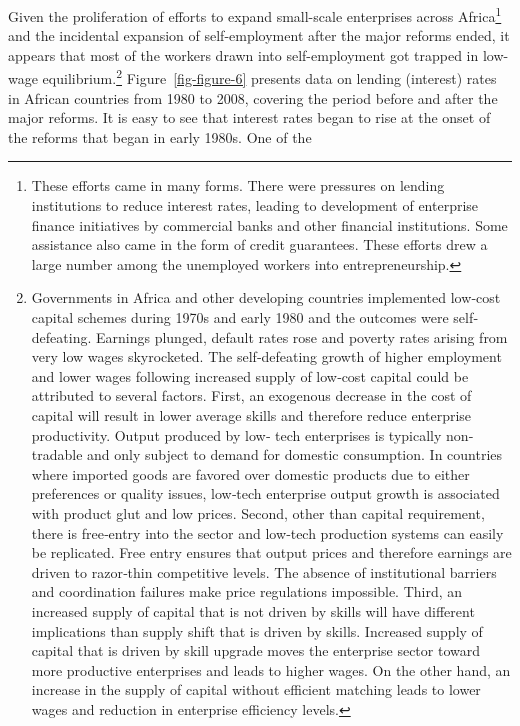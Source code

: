 \documentclass[
  a4paper,
  DIV=11,
  numbers=noendperiod]{scrartcl}
\begin{document}
Given the proliferation of efforts to expand small-scale enterprises
across Africa\footnote{These efforts came in many forms. There were
  pressures on lending institutions to reduce interest rates, leading to
  development of enterprise finance initiatives by commercial banks and
  other financial institutions. Some assistance also came in the form of
  credit guarantees. These efforts drew a large number among the
  unemployed workers into entrepreneurship.} and the incidental
expansion of self-employment after the major reforms ended, it appears
that most of the workers drawn into self-employment got trapped in
low-wage equilibrium.\footnote{Governments in Africa and other
  developing countries implemented low‐cost capital schemes during 1970s
  and early 1980 and the outcomes were self‐defeating. Earnings plunged,
  default rates rose and poverty rates arising from very low wages
  skyrocketed. The self‐defeating growth of higher employment and lower
  wages following increased supply of low‐cost capital could be
  attributed to several factors. First, an exogenous decrease in the
  cost of capital will result in lower average skills and therefore
  reduce enterprise productivity. Output produced by low‐ tech
  enterprises is typically non‐tradable and only subject to demand for
  domestic consumption. In countries where imported goods are favored
  over domestic products due to either preferences or quality issues,
  low‐tech enterprise output growth is associated with product glut and
  low prices. Second, other than capital requirement, there is
  free‐entry into the sector and low‐tech production systems can easily
  be replicated. Free entry ensures that output prices and therefore
  earnings are driven to razor‐thin competitive levels. The absence of
  institutional barriers and coordination failures make price
  regulations impossible. Third, an increased supply of capital that is
  not driven by skills will have different implications than supply
  shift that is driven by skills. Increased supply of capital that is
  driven by skill upgrade moves the enterprise sector toward more
  productive enterprises and leads to higher wages. On the other hand,
  an increase in the supply of capital without efficient matching leads
  to lower wages and reduction in enterprise efficiency levels.}
Figure~\ref{fig-figure-6} presents data on lending (interest) rates in
African countries from 1980 to 2008, covering the period before and
after the major reforms. It is easy to see that interest rates began to
rise at the onset of the reforms that began in early 1980s. One of the
\end{document}
